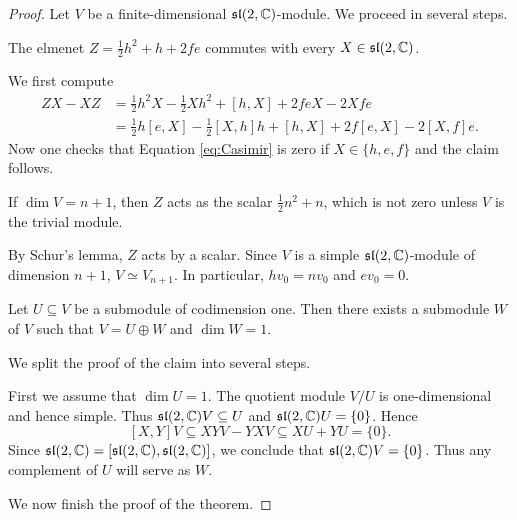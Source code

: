 \begin{proof}
    Let $V$ be a finite-dimensional $\mathfrak{sl}(2,\mathbb{C})$-module. 
    We proceed in several steps.
    
    \begin{claim}
        The elmenet $Z=\frac12h^2+h+2fe$ commutes with every $X\in\mathfrak{sl}(2,\mathbb{C})$. 
    \end{claim}
    
    We first compute
    \begin{equation}
        \begin{aligned}
            \label{eq:Casimir}
            ZX-XZ &= \frac12h^2X-\frac12Xh^2+[h,X]+2feX-2Xfe\\
            &=\frac12h[e,X]-\frac12[X,h]h+[h,X]+2f[e,X]-2[X,f]e.
        \end{aligned}
    \end{equation}
    Now one checks that 
    Equation \eqref{eq:Casimir} is zero if $X\in\{h,e,f\}$ and
    the claim follows. 
    
    \begin{claim}
        If $\dim V=n+1$, then $Z$ acts as the scalar 
        $\frac12n^2+n$, which is not zero unless $V$ is the trivial module. 
    \end{claim}
    
    By Schur's lemma, $Z$ acts by a scalar. Since $V$ is a simple
    $\mathfrak{sl}(2,\mathbb{C})$-module of dimension $n+1$, $V\simeq V_{n+1}$. In particular, 
    $hv_0=nv_0$ and $ev_0=0$. 
    
    \begin{claim}
        Let $U\subseteq V$ be a submodule of codimension one. Then 
        there exists a submodule $W$ of $V$ such that $V=U\oplus W$ 
        and $\dim W=1$. 
    \end{claim}
    
    We split the proof of the claim into several steps. 
    
    First we assume that
    $\dim U=1$. The quotient module $V/U$ is one-dimensional and hence simple. 
    Thus $\mathfrak{sl}(2,\mathbb{C})V\subseteq U$ and $\mathfrak{sl}(2,\mathbb{C})U=\{0\}$. Hence 
    \[
    [X,Y]V\subseteq XYV-YXV\subseteq XU+YU=\{0\}.
    \]
    Since $\mathfrak{sl}(2,\mathbb{C})=[\mathfrak{sl}(2,\mathbb{C}),\mathfrak{sl}(2,\mathbb{C})]$, we conclude that
    $\mathfrak{sl}(2,\mathbb{C})V=\{0\}$. Thus any complement of $U$ will serve as $W$. 
    
    \medskip
    We now finish the proof of the theorem. 
\end{proof}

